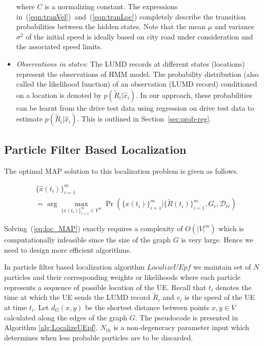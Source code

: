 \documentclass[conference, 10pt]{IEEEtran}
\begin{document}
\begin{itemize}
where $C$ is a normalizing constant. The expressions
in~(\ref{eqn:tranVel})~and~(\ref{eqn:tranLoc}) completely describe the
transition probabilities between the hidden states. Note that the mean $\mu$ and
variance $\sigma^2$ of the initial speed is ideally based on city road under
consideration and the associated speed limits.

\item {\em Observations in states:} The LUMD records at different states
(locations) represent the observations of HMM model. The probability
distribution (also called the likelihood function) of an observation (LUMD record) 
conditioned on a location is denoted by
$p(\tilde{R}_i|\hat{x}_{i})$. In our approach, these probabilities
can be learnt from the drive test data using regression on drive test data to
estimate $p(\tilde{R}_i|\hat{x}_{i})$. This is outlined in Section~\ref{sec:prob-reg}.



\end{itemize}


\subsection{Particle Filter Based Localization}
\label{sec:particle_filter}

The optimal MAP solution to this localization problem is given as follows.

\begin{align}
&\{\hat{x}(t_i)\}_{i=1}^m \nonumber \\
& = \arg \max_{\{x(t_i)\}_{i=1}^m \in V^m}
\Pr(\{x(t_i)\}_{i=1}^m|\{\tilde{R}(t_i)\}_{i=1}^m,G_r,\mathcal{D}_{tr}) \label{eq:loc_MAP}
\end{align}


Solving~(\ref{eq:loc_MAP}) exactly requires a complexity of $O(|V|^m)$
which is computationally infeasible since the size of the graph $G$ is very
large. Hence we need to design more efficient algorithms.

In particle filter based localization algorithm $LocalizeUEpf$ we maintain set
of $N$ particles and their corresponding weights or likelihoods where each
particle represents a sequence of possible location of the UE. Recall that $t_i$
denotes the time at which the UE sends the LUMD record $\tilde{R}_i$ and $v_i$ is
the speed of the UE at time $t_i.$ Let $d_G(x,y)$ be the shortest distance
between points $x,y \in V$ calculated along the edges of the graph $G.$ The
pseudocode is presented in Algorithm \ref{alg:LocalizeUEpf}. $N_{th}$ is a
non-degeneracy parameter input which determines when less probable particles are
to be discarded. 
\end{document}
